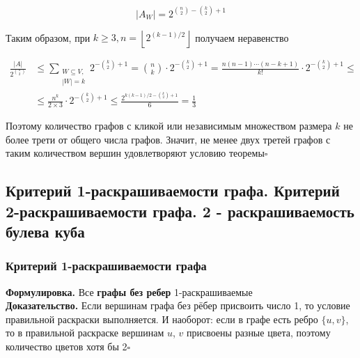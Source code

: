 \documentclass[a4paper]{article}
\newcommand{\qed}{\hfill$\square$}
\begin{document}
$$
\left|A_{W}\right|=2^{\binom{n}{2}-\binom{k}{2}+1}
$$

Таким образом, при $k \geqslant 3, n=\left\lfloor 2^{(k-1) / 2}\right\rfloor$ получаем неравенство

$$
\begin{aligned}
\frac{|A|}{2^{\binom{n}{2}}} & \leqslant \sum_{\substack{W \subseteq V,\\|W|=k}} 2^{-\binom{k}{2}+1}=\binom{n}{k} \cdot 2^{-\binom{k}{2}+1}=
\frac{n(n-1) \cdots(n-k+1)}{k !} \cdot 2^{-\binom{k}{2}+1} \leqslant \\
& \leqslant \frac{n^{k}}{2 \times 3} \cdot 2^{-\binom{k}{2}+1} \leqslant \frac{2^{k(k-1) / 2-\binom{k}{2}+1}}{6}=\frac{1}{3}
\end{aligned}
$$

Поэтому количество графов с кликой или независимым множеством размера $k$ не более трети от общего числа графов. 
Значит, не менее двух третей графов с таким количеством вершин удовлетворяют условию теоремы\qed


\subsection{Критерий 1-раскрашиваемости графа. Критерий 2-раскрашиваемости графа. 2 - раскрашиваемость булева куба}
\subsubsection*{Критерий 1-раскрашиваемости графа}
\textbf{Формулировка.} Все \textbf{графы без ребер} 1-раскрашиваемые\\[2mm]
\indent\textbf{Доказательство.} Если вершинам графа без рёбер присвоить число 1, то условие правильной раскраски выполняется. И наоборот: если в графе есть ребро $\{u, v\}$, то в правильной раскраске вершинам $u$, $v$ присвоены разные цвета, поэтому количество цветов хотя бы 2\hfill$\square$
\end{document}
